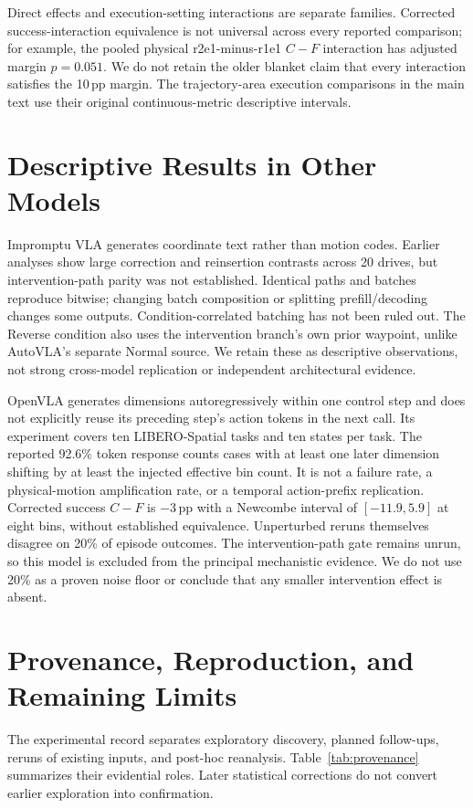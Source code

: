 Direct effects and execution-setting interactions are separate families. Corrected success-interaction equivalence is not universal across every reported comparison; for example, the pooled physical r2e1-minus-r1e1 $C-F$ interaction has adjusted margin $p=0.051$. We do not retain the older blanket claim that every interaction satisfies the 10\,pp margin. The trajectory-area execution comparisons in the main text use their original continuous-metric descriptive intervals.

\section{Descriptive Results in Other Models}
\label{app:othermodels}
Impromptu VLA generates coordinate text rather than motion codes. Earlier analyses show large correction and reinsertion contrasts across 20 drives, but intervention-path parity was not established. Identical paths and batches reproduce bitwise; changing batch composition or splitting prefill/decoding changes some outputs. Condition-correlated batching has not been ruled out. The Reverse condition also uses the intervention branch's own prior waypoint, unlike AutoVLA's separate Normal source. We retain these as descriptive observations, not strong cross-model replication or independent architectural evidence.

OpenVLA generates dimensions autoregressively within one control step and does not explicitly reuse its preceding step's action tokens in the next call. Its experiment covers ten LIBERO-Spatial tasks and ten states per task. The reported 92.6\% token response counts cases with at least one later dimension shifting by at least the injected effective bin count. It is not a failure rate, a physical-motion amplification rate, or a temporal action-prefix replication. Corrected success $C-F$ is $-3$\,pp with a Newcombe interval of $[-11.9,5.9]$ at eight bins, without established equivalence. Unperturbed reruns themselves disagree on 20\% of episode outcomes. The intervention-path gate remains unrun, so this model is excluded from the principal mechanistic evidence. We do not use 20\% as a proven noise floor or conclude that any smaller intervention effect is absent.

\section{Provenance, Reproduction, and Remaining Limits}
\label{app:provenance}
The experimental record separates exploratory discovery, planned follow-ups, reruns of existing inputs, and post-hoc reanalysis. Table~\ref{tab:provenance} summarizes their evidential roles. Later statistical corrections do not convert earlier exploration into confirmation.

